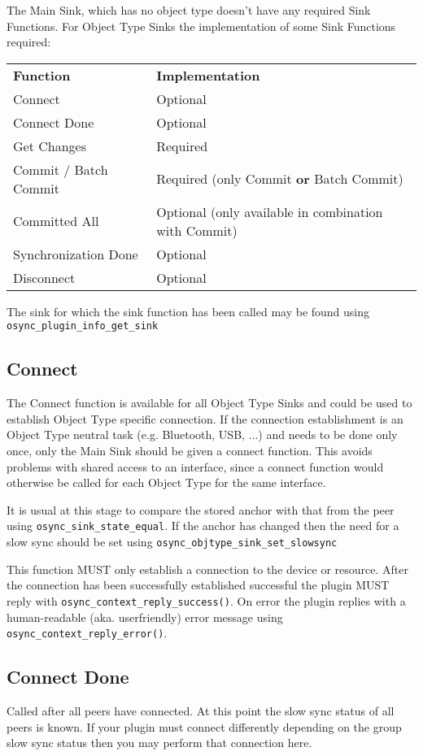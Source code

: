 The Main Sink, which has no object type doesn't have any required Sink 
Functions. For Object Type Sinks the implementation of some Sink 
Functions required:

\begin{center}
\begin{tabular}{ll}
\textbf{Function} & \textbf{Implementation} \\ 
Connect & Optional \\
Connect Done & Optional \\
Get Changes & Required \\ 
Commit / Batch Commit & Required (only Commit \textbf{or} Batch Commit) \\ 
Committed All & Optional (only available in combination with Commit)\\ 
Synchronization Done & Optional \\ 
Disconnect & Optional
\end{tabular}
\end{center}

The sink for which the sink function has been called may be found using
\verb|osync_plugin_info_get_sink|

\subsection{Connect}
The Connect function is available for all Object Type Sinks and could be used to
establish Object Type specific connection. If the connection establishment is an
Object Type neutral task (e.g. Bluetooth, USB, ...) and needs to be done only
once, only the Main Sink should be given a connect function. This avoids
problems with shared access to an interface, since a connect function would
otherwise be called for each Object Type for the same interface.

It is usual at this stage to compare the stored anchor with that from the peer
using \verb|osync_sink_state_equal|.  If the anchor has changed then the need for
a slow sync should be set using \verb|osync_objtype_sink_set_slowsync|

This function MUST only establish a connection to the device or resource. After
the connection has been successfully established successful the plugin MUST
reply with \verb|osync_context_reply_success()|. On error the plugin replies
with a human-readable (aka. userfriendly) error message using
\verb|osync_context_reply_error()|.
\subsection{Connect Done}
Called after all peers have connected.  At this point the slow sync status of
all peers is known.  If your plugin must connect differently depending on the
group slow sync status then you may perform that connection here.
